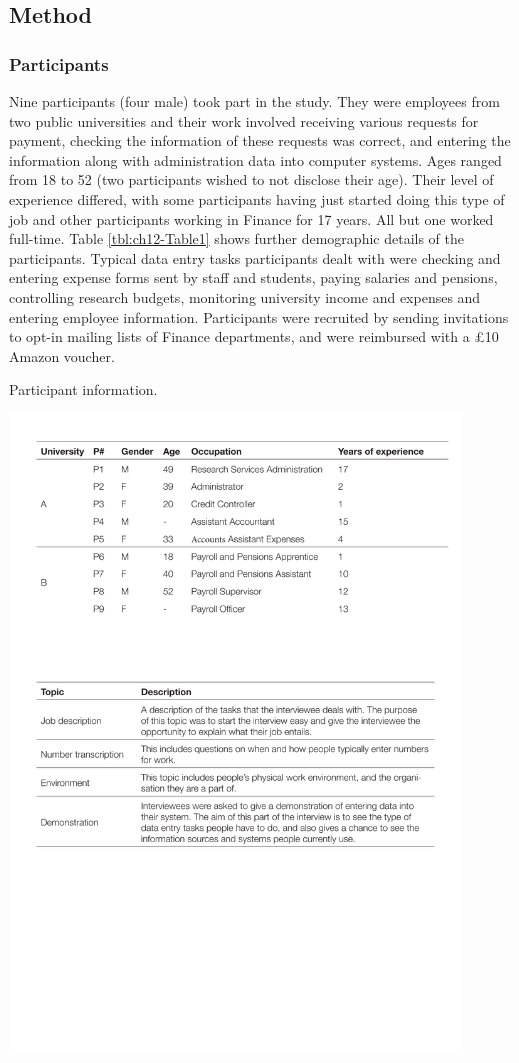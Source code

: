 \subsection{Method}
\subsubsection{Participants}
Nine participants (four male) took part in the study. They were employees from two public universities and their work involved receiving various requests for payment, checking the information of these requests was correct, and entering the information along with administration data into computer systems. Ages ranged from 18 to 52 (two participants wished to not disclose their age). Their level of experience differed, with some participants having just started doing this type of job and other participants working in Finance for 17 years. All but one worked full-time. Table \ref{tbl:ch12-Table1} shows further demographic details of the participants. Typical data entry tasks participants dealt with were checking and entering expense forms sent by staff and students, paying salaries and pensions, controlling research budgets, monitoring university income and expenses and entering employee information. Participants were recruited by sending invitations to opt-in mailing lists of Finance departments, and were reimbursed with a \pounds10 Amazon voucher.

\begin{table}
\caption[Study 1 participant information]{Participant information.}
\centering
\includegraphics[width=0.9\textwidth]{images/ch12/ch12_participants.pdf}
\vspace{-3pt}
\label{tbl:ch12-Table1}
\end{table}

